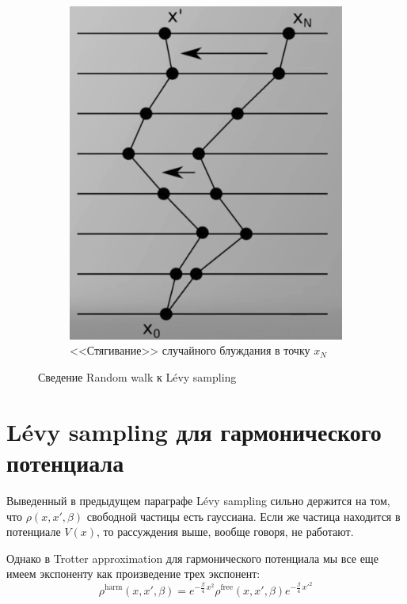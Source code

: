 \begin{lecture}
\begin{figure}[ht]
\begin{subfigure}{0.5\columnwidth}
            \includegraphics[width=\linewidth]{fig/random-walk-pulling}
            \caption{<<Стягивание>> случайного блуждания в точку $x_N$}
            \label{fig:random-walk-pulling}
        \end{subfigure}
        \caption{Сведение Random walk к Lévy sampling}
    \end{figure}

    \section{Lévy sampling для гармонического потенциала}
    Выведенный в предыдущем параграфе Lévy sampling сильно держится на том, что $\rho (x, x', \beta)$ свободной частицы есть гауссиана.
    Если же частица находится в потенциале $V(x)$, то рассуждения выше, вообще говоря, не работают.

    Однако в Trotter approximation для гармонического потенциала мы все еще имеем экспоненту как произведение трех экспонент:
    \begin{equation}
        \label{eq:rho_harmonic-trotter}
        \rho^{\text{harm}} (x, x', \beta) = e^{-\frac{\beta}{4}\, x^2} \rho^{\text{free}} (x, x', \beta) e^{-\frac{\beta}{4}\, {x'}^2}
    \end{equation}


\end{lecture}
